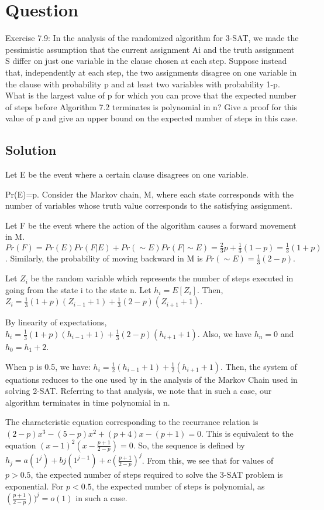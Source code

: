 \documentclass[10pt]{amsart}
\theoremstyle{remark}
\begin{document}
\section{Question}
Exercise 7.9: In the analysis of the randomized algorithm for 3-SAT, we made the pessimistic assumption that the current assignment Ai and the truth assignment S differ on just one variable in the clause chosen at each step. Suppose instead that, independently at each step, the two assignments disagree on one variable in the clause with probability p and at least two variables with probability 1-p. What is the largest value of p for which you can prove that the expected number of steps before Algorithm 7.2 terminates is polynomial in n? Give a proof for this value of p and give an upper bound on the expected number of steps in this case.

\subsection{Solution}
Let E be the event where a certain clause disagrees on one variable.

Pr(E)=p. Consider the Markov chain, M, where each state corresponds with the number of variables whose truth value corresponds to the satisfying assignment.

Let F be the event where the action of the algorithm causes a forward movement in M. $Pr(F) = Pr(E)Pr(F|E) + Pr(\sim E)Pr(F|\sim E) = \frac{2}{3}p + \frac{1}{3}(1-p) = \frac{1}{3}(1+p)$. Similarly, the probability of moving backward in M is $Pr(\sim E) = \frac{1}{3}(2-p)$.

Let $Z_{i}$ be the random variable which represents the number of steps executed in going from the state i to the state n. Let $h_{i}=E[Z_{i}]$. Then, $Z_{i}=\frac{1}{3}(1+p)(Z_{i-1}+1)+\frac{1}{3}(2-p)(Z_{i+1}+1)$.

By linearity of expectations, $h_{i}=\frac{1}{3}(1+p)(h_{i-1}+1)+\frac{1}{3}(2-p)(h_{i+1}+1)$. Also, we have $h_{n}=0$ and $h_{0}=h_{1}+2$.

When p is 0.5, we have: $h_{i}=\frac{1}{2}(h_{i-1}+1)+\frac{1}{2}(h_{i+1}+1)$. Then, the system of equations reduces to the one used by \cite{mitzenmacherUpfal} in the analysis of the Markov Chain used in solving 2-SAT. Referring to that analysis, we note that in such a case, our algorithm terminates in time polynomial in n.

The characteristic equation corresponding to the recurrance relation is $(2-p)x^{3}-(5-p)x^{2}+(p+4)x - (p+1) =0$. This is equivalent to the equation $(x-1)^{2}(x-\frac{p+1}{2-p})=0$. So, the sequence is defined by $h_{j} = a(1^{j}) + bj(1^{j-1}) + c(\frac{p+1}{2-p})^{j}$. From this, we see that for values of $p>0.5$, the expected number of steps required to solve the 3-SAT problem is exponential. For $p < 0.5$, the expected number of steps is polynomial, as $(\frac{p+1}{2-p}))^{j} = o(1)$ in such a case.
\end{document}
